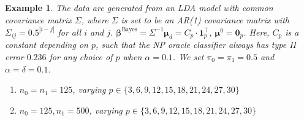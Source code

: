 \documentclass[12pt]{article}
\numberwithin{equation}{section}
\newtheorem{example}{Example}
\theoremstyle{remark}
\newcommand{\1}{{\rm 1}\kern-0.24em{\rm I}}
\begin{document}
\begin{example}
The data are generated from an LDA model with common covariance matrix $\Sigma$, where $\Sigma$ is set to be an AR(1) covariance matrix with $\Sigma_{ij}=0.5^{|i-j|}$ for all $i$ and $j$. $\bm{\beta}^{\text{Bayes}}=\Sigma^{-1}\bm{\mu}_d = C_p \cdot \bm{1}_p^{\top}$, $\bm{\mu}^0=\bm{0}_p$. Here, $C_p$ is a constant depending on $p$, such that the NP oracle classifier always has type II error $0.236$ for any choice of $p$ when $\alpha = 0.1$. We set $\pi_0 = \pi_1 = 0.5$ and $\alpha=\delta=0.1$. 
\begin{enumerate}
  \item[(2a)] $n_0 = n_1 = 125$, varying $p \in \{3,6,9,12,15,18,21,24,27,30\}$
  \item[(2b)] $n_0 = 125, n_1 = 500$, varying $p \in \{3,6,9,12,15,18,21,24,27,30\}$
\end{enumerate}
\end{example}


    
\end{document}
